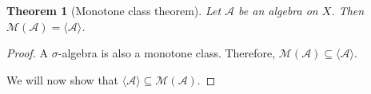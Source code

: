 \documentclass{article}
\theoremstyle{plain}
\newtheorem{thm}{Theorem}
\numberwithin{thm}{section}
\theoremstyle{plain}
\numberwithin{prop}{section}
\theoremstyle{definition}
\numberwithin{defn}{section}
\theoremstyle{remark}
\theoremstyle{plain}
\numberwithin{cor}{section}
\numberwithin{equation}{section}
\begin{document}
\begin{thm}[Monotone class theorem]\label{s6t1}
Let $\mathcal{A}$ be an algebra on $X$. Then $\mathcal{M}(\mathcal{A}) = \langle
\mathcal{A}\rangle$.
\end{thm}
\begin{proof}
A $\sigma$-algebra is also a monotone class. Therefore, $\mathcal{M}(\mathcal{A})
\subseteq \langle\mathcal{A}\rangle$.

We will now show that $\langle\mathcal{A}\rangle\subseteq\mathcal{M}(\mathcal{A})$.
\end{proof}
\end{document}
